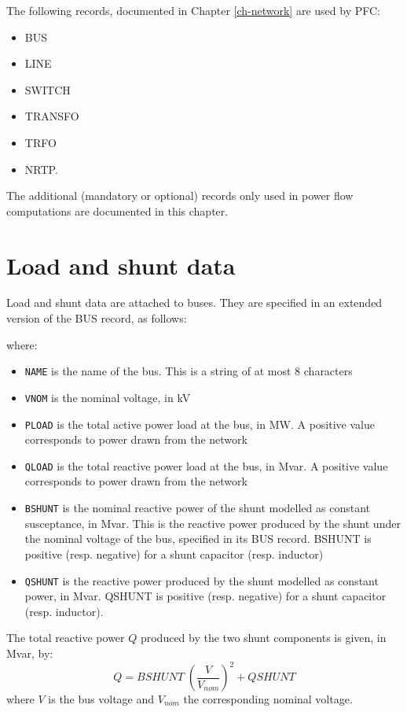 The following records, documented in Chapter \ref{ch-network} are used by PFC:
\begin{itemize}
\item[] BUS
\item[] LINE
\item[] SWITCH
\item[] TRANSFO
\item[] TRFO
\item[] NRTP.
\end{itemize}

The additional (mandatory or optional) records only used in power flow computations are documented in this chapter.

\section{Load and shunt data}\label{sec-pf-bus}

Load and shunt data are attached to buses. They are specified in an extended version of the BUS record, as follows:

\hspace*{5ex}{\tt BUS NAME VNOM PLOAD QLOAD BSHUNT QSHUNT ;}

where:
\begin{itemize}
\item {\tt NAME} is the name of the bus. This is a string of at most 8 characters
\item {\tt VNOM} is the nominal voltage, in kV
\item {\tt PLOAD} is the total active power load at the bus, in MW. A positive value corresponds to power drawn from the network
\item {\tt QLOAD} is the total reactive power load at the bus, in Mvar. A positive value corresponds to power drawn from the network
\item {\tt BSHUNT} is the nominal reactive power of the shunt modelled as constant susceptance, in Mvar. This is the reactive power produced by the shunt under the nominal voltage of the bus, specified in its BUS record. BSHUNT is positive (resp. negative) for a shunt capacitor (resp. inductor)
\item {\tt QSHUNT} is the reactive power produced by the shunt modelled as constant power, in Mvar. QSHUNT is positive (resp. negative) for a shunt capacitor (resp. inductor).
\end{itemize}

The total reactive power $Q$ produced by the two shunt components is given, in Mvar, by:
\[ Q = BSHUNT \; (\frac{V}{V_{nom}})^2 + QSHUNT \]
where $V$ is the bus voltage and $V_{nom}$ the corresponding nominal voltage.

